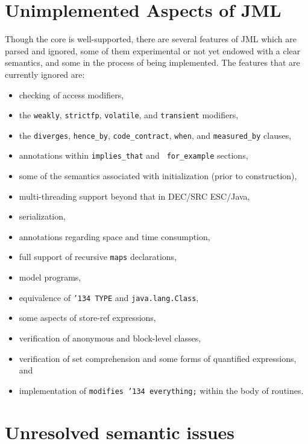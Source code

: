 \documentclass{acm_proc_article-sp}
\begin{document}
\section{Unimplemented Aspects of JML}

Though the core is well-supported, there are several features of JML
which are parsed and ignored, some of them experimental or not yet
endowed with a clear semantics, and some in the process of being implemented.
  The features that are currently ignored are:
\setlength{\partopsep}{0in}\setlength{\parskip}{0in}\setlength{\itemsep}{0in}\setlength{\topsep}{0in}
\begin{itemize}
\setlength{\partopsep}{0in}\setlength{\parskip}{0in}\setlength{\itemsep}{0in}\setlength{\topsep}{0in}
\item checking of access modifiers,
\item the \texttt{weakly}, \texttt{strictfp}, \texttt{volatile}, and
  \texttt{transient} modifiers,
\item the \texttt{diverges}, \texttt{hence\_by},
  \texttt{code\_contract}, \texttt{when}, and \texttt{measured\_by}
  clauses,
\item annotations within \texttt{implies\_that} and {\tt
    for\_example} sections,
\item some of the semantics associated with initialization (prior to
  construction),
\item multi-threading support beyond that in DEC/SRC ESC/\-Java,
\item serialization,
\item annotations regarding space and time consumption,
\item full support of recursive \texttt{maps} declarations,
\item model programs, 
\item equivalence of \texttt{\char'134 TYPE} and \texttt{java.lang.Class},
\item some aspects of store-ref expressions,
\item verification of anonymous and block-level classes,
\item verification of set comprehension and some forms of quantified
  expressions, and
\item implementation of \texttt{modifies \char'134 everything;} within
  the body of routines.
\end{itemize}


\section{Unresolved semantic issues}
\end{document}
